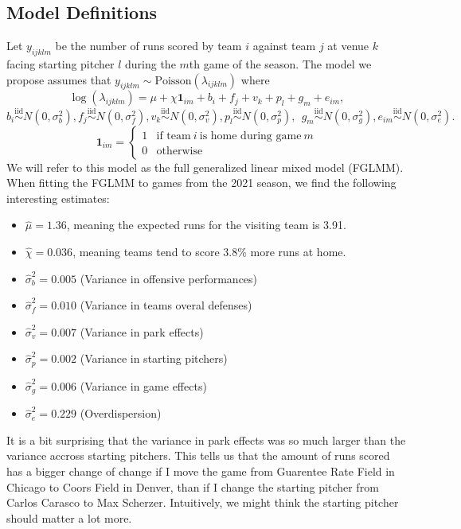 \documentclass [52pt] {article}
\newcommand{\simiid}{\overset{\text{iid}}{\sim}}
\begin{document}
\subsection{Model Definitions}
Let $y_{ijklm}$ be the number of runs scored by team $i$ against team $j$ at venue $k$ facing starting pitcher $l$ during the $m$th game of the season.  The model we propose assumes that $y_{ijklm}\sim\text{Poisson}(\lambda_{ijklm})$ where
\begin{equation}\label{eq : model1}
\log(\lambda_{ijklm}) = \mu + \chi \mathbf{1}_{im} + b_i + f_j + v_k + p_l + g_m + e_{im},
\end{equation}
\[b_i\simiid N(0,\sigma^2_b), f_j\simiid N(0,\sigma^2_f), v_k\simiid N(0,\sigma^2_v), p_l\simiid N(0, \sigma^2_p),\:\:g_m\simiid N(0, \sigma^2_g), e_{im}\simiid N(0,\sigma^2_e).\]
\[\mathbf{1}_{im} = \begin{cases}
1 & \text{if team}\:i\:\text{is home during game}\:m\\
0 &\text{otherwise}
\end{cases}\]
We will refer to this model as the full generalized linear mixed model (FGLMM).  When fitting the FGLMM to games from the 2021 season, we find the following interesting estimates:
\begin{itemize}
    \item $\hat{\mu} = 1.36$, meaning the expected runs for the visiting team is 3.91.
    \item $\hat{\chi} = 0.036$, meaning teams tend to score 3.8\% more runs at home.
    \item $\hat{\sigma}^2_b = 0.005$ (Variance in offensive performances)
    \item $\hat{\sigma}^2_f = 0.010$ (Variance in teams overal defenses)
    \item $\hat{\sigma}^2_v = 0.007$ (Variance in park effects)
    \item $\hat{\sigma}^2_p = 0.002$ (Variance in starting pitchers)
    \item $\hat{\sigma}^2_g = 0.006$ (Variance in game effects)
    \item $\hat{\sigma}^2_e = 0.229$ (Overdispersion)
\end{itemize}
It is a bit surprising that the variance in park effects was so much larger than the variance accross starting pitchers.  This tells us that the amount of runs scored has a bigger change of change if I move the game from Guarentee Rate Field in Chicago to Coors Field in Denver, than if I change the starting pitcher from Carlos Carasco to Max Scherzer.  Intuitively, we might think the starting pitcher should matter a lot more.
\end{document}
